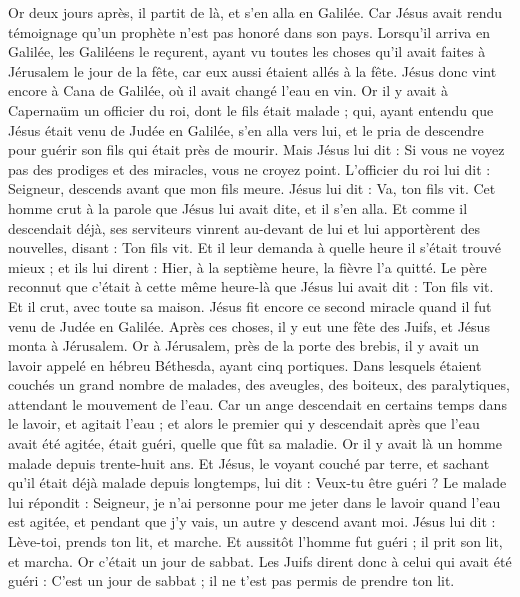 \begin{multicols}{2}
Or deux jours après, il partit de là, et s'en alla en Galilée.
Car Jésus avait rendu témoignage qu'un prophète n'est pas honoré dans son pays.
Lorsqu'il arriva en Galilée, les Galiléens le reçurent, ayant vu toutes les choses qu'il avait faites à Jérusalem le jour de la fête, car eux aussi étaient allés à la fête.
Jésus donc vint encore à Cana de Galilée, où il avait changé l'eau en vin. Or il y avait à Capernaüm un officier du roi, dont le fils était malade ;
qui, ayant entendu que Jésus était venu de Judée en Galilée, s'en alla vers lui, et le pria de descendre pour guérir son fils qui était près de mourir.
Mais Jésus lui dit : Si vous ne voyez pas des prodiges et des miracles, vous ne croyez point.
L'officier du roi lui dit : Seigneur, descends avant que mon fils meure.
Jésus lui dit : Va, ton fils vit. Cet homme crut à la parole que Jésus lui avait dite, et il s'en alla.
Et comme il descendait déjà, ses serviteurs vinrent au-devant de lui et lui apportèrent des nouvelles, disant : Ton fils vit.
Et il leur demanda à quelle heure il s'était trouvé mieux ; et ils lui dirent : Hier, à la septième heure, la fièvre l'a quitté.
Le père reconnut que c'était à cette même heure-là que Jésus lui avait dit : Ton fils vit. Et il crut, avec toute sa maison.
Jésus fit encore ce second miracle quand il fut venu de Judée en Galilée.
\VerseOne{}Après ces choses, il y eut une fête des Juifs, et Jésus monta à Jérusalem.
Or à Jérusalem, près de la porte des brebis, il y avait un lavoir appelé en hébreu Béthesda, ayant cinq portiques.
Dans lesquels étaient couchés un grand nombre de malades, des aveugles, des boiteux, des paralytiques, attendant le mouvement de l'eau.
Car un ange descendait en certains temps dans le lavoir, et agitait l'eau ; et alors le premier qui y descendait après que l'eau avait été agitée, était guéri, quelle que fût sa maladie.
Or il y avait là un homme malade depuis trente-huit ans.
Et Jésus, le voyant couché par terre, et sachant qu'il était déjà malade depuis longtemps, lui dit : Veux-tu être guéri ?
Le malade lui répondit : Seigneur, je n'ai personne pour me jeter dans le lavoir quand l'eau est agitée, et pendant que j'y vais, un autre y descend avant moi.
Jésus lui dit : Lève-toi, prends ton lit, et marche.
Et aussitôt l'homme fut guéri ; il prit son lit, et marcha. Or c'était un jour de sabbat.
Les Juifs dirent donc à celui qui avait été guéri : C'est un jour de sabbat ; il ne t'est pas permis de prendre ton lit.

\end{multicols}
